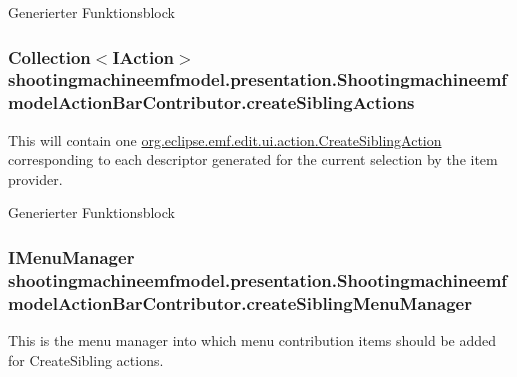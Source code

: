 Generierter Funktionsblock \hypertarget{classshootingmachineemfmodel_1_1presentation_1_1_shootingmachineemfmodel_action_bar_contributor_ae5ca03f06af30783c510f992b876c321}{
\subsubsection[{create\-Sibling\-Actions}]{\setlength{\rightskip}{0pt plus 5cm}Collection$<$I\-Action$>$ shootingmachineemfmodel.\-presentation.\-Shootingmachineemfmodel\-Action\-Bar\-Contributor.\-create\-Sibling\-Actions\hspace{0.3cm}{\ttfamily [protected]}}}\label{classshootingmachineemfmodel_1_1presentation_1_1_shootingmachineemfmodel_action_bar_contributor_ae5ca03f06af30783c510f992b876c321}
This will contain one \hyperlink{}{org.\-eclipse.\-emf.\-edit.\-ui.\-action.\-Create\-Sibling\-Action} corresponding to each descriptor generated for the current selection by the item provider.

Generierter Funktionsblock \hypertarget{classshootingmachineemfmodel_1_1presentation_1_1_shootingmachineemfmodel_action_bar_contributor_aee6eb2c90657fd95075944eab92bd344}{
\subsubsection[{create\-Sibling\-Menu\-Manager}]{\setlength{\rightskip}{0pt plus 5cm}I\-Menu\-Manager shootingmachineemfmodel.\-presentation.\-Shootingmachineemfmodel\-Action\-Bar\-Contributor.\-create\-Sibling\-Menu\-Manager\hspace{0.3cm}{\ttfamily [protected]}}}\label{classshootingmachineemfmodel_1_1presentation_1_1_shootingmachineemfmodel_action_bar_contributor_aee6eb2c90657fd95075944eab92bd344}
This is the menu manager into which menu contribution items should be added for Create\-Sibling actions.

